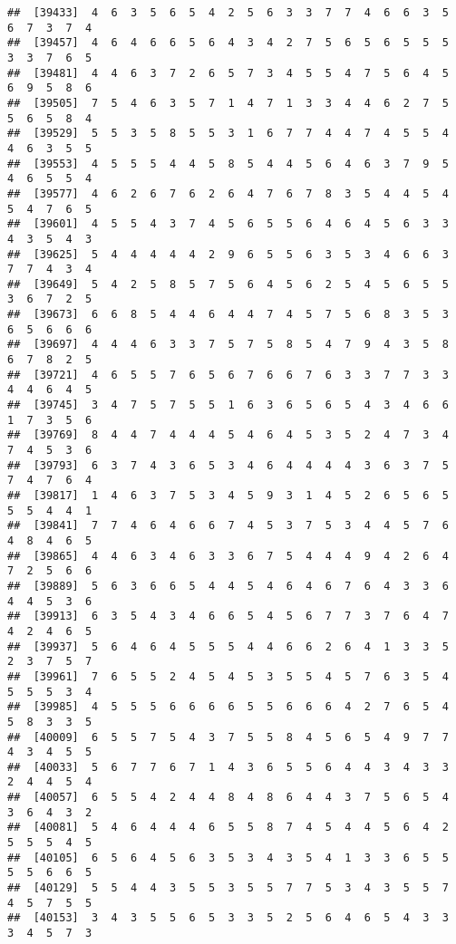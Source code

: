 \documentclass[
]{book}
\begin{document}
\begin{verbatim}
##  [39433]  4  6  3  5  6  5  4  2  5  6  3  3  7  7  4  6  6  3  5  6  7  3  7  4
##  [39457]  4  6  4  6  6  5  6  4  3  4  2  7  5  6  5  6  5  5  5  3  3  7  6  5
##  [39481]  4  4  6  3  7  2  6  5  7  3  4  5  5  4  7  5  6  4  5  6  9  5  8  6
##  [39505]  7  5  4  6  3  5  7  1  4  7  1  3  3  4  4  6  2  7  5  5  6  5  8  4
##  [39529]  5  5  3  5  8  5  5  3  1  6  7  7  4  4  7  4  5  5  4  4  6  3  5  5
##  [39553]  4  5  5  5  4  4  5  8  5  4  4  5  6  4  6  3  7  9  5  4  6  5  5  4
##  [39577]  4  6  2  6  7  6  2  6  4  7  6  7  8  3  5  4  4  5  4  5  4  7  6  5
##  [39601]  4  5  5  4  3  7  4  5  6  5  5  6  4  6  4  5  6  3  3  4  3  5  4  3
##  [39625]  5  4  4  4  4  4  2  9  6  5  5  6  3  5  3  4  6  6  3  7  7  4  3  4
##  [39649]  5  4  2  5  8  5  7  5  6  4  5  6  2  5  4  5  6  5  5  3  6  7  2  5
##  [39673]  6  6  8  5  4  4  6  4  4  7  4  5  7  5  6  8  3  5  3  6  5  6  6  6
##  [39697]  4  4  4  6  3  3  7  5  7  5  8  5  4  7  9  4  3  5  8  6  7  8  2  5
##  [39721]  4  6  5  5  7  6  5  6  7  6  6  7  6  3  3  7  7  3  3  4  4  6  4  5
##  [39745]  3  4  7  5  7  5  5  1  6  3  6  5  6  5  4  3  4  6  6  1  7  3  5  6
##  [39769]  8  4  4  7  4  4  4  5  4  6  4  5  3  5  2  4  7  3  4  7  4  5  3  6
##  [39793]  6  3  7  4  3  6  5  3  4  6  4  4  4  4  3  6  3  7  5  7  4  7  6  4
##  [39817]  1  4  6  3  7  5  3  4  5  9  3  1  4  5  2  6  5  6  5  5  5  4  4  1
##  [39841]  7  7  4  6  4  6  6  7  4  5  3  7  5  3  4  4  5  7  6  4  8  4  6  5
##  [39865]  4  4  6  3  4  6  3  3  6  7  5  4  4  4  9  4  2  6  4  7  2  5  6  6
##  [39889]  5  6  3  6  6  5  4  4  5  4  6  4  6  7  6  4  3  3  6  4  4  5  3  6
##  [39913]  6  3  5  4  3  4  6  6  5  4  5  6  7  7  3  7  6  4  7  4  2  4  6  5
##  [39937]  5  6  4  6  4  5  5  5  4  4  6  6  2  6  4  1  3  3  5  2  3  7  5  7
##  [39961]  7  6  5  5  2  4  5  4  5  3  5  5  4  5  7  6  3  5  4  5  5  5  3  4
##  [39985]  4  5  5  5  6  6  6  6  5  5  6  6  6  4  2  7  6  5  4  5  8  3  3  5
##  [40009]  6  5  5  7  5  4  3  7  5  5  8  4  5  6  5  4  9  7  7  4  3  4  5  5
##  [40033]  5  6  7  7  6  7  1  4  3  6  5  5  6  4  4  3  4  3  3  2  4  4  5  4
##  [40057]  6  5  5  4  2  4  4  8  4  8  6  4  4  3  7  5  6  5  4  3  6  4  3  2
##  [40081]  5  4  6  4  4  4  6  5  5  8  7  4  5  4  4  5  6  4  2  5  5  5  4  5
##  [40105]  6  5  6  4  5  6  3  5  3  4  3  5  4  1  3  3  6  5  5  5  5  6  6  5
##  [40129]  5  5  4  4  3  5  5  3  5  5  7  7  5  3  4  3  5  5  7  4  5  7  5  5
##  [40153]  3  4  3  5  5  6  5  3  3  5  2  5  6  4  6  5  4  3  3  3  4  5  7  3

\end{verbatim}
\end{document}
